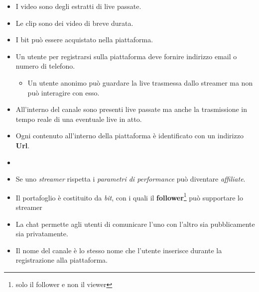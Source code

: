\begin{itemize}
    \item I video sono degli estratti di live passate.
    \item Le clip sono dei video di breve durata.
    \item I bit può essere acquistato nella piattaforma.
    \item Un utente per registrarsi sulla piattaforma deve fornire indirizzo email o numero di telefono.
    \begin{itemize}
        \item Un utente anonimo può guardare la live trasmessa dallo streamer ma non può interagire con esso. 
    \end{itemize}
    \item All'interno del canale sono presenti live passate ma anche la trasmissione in tempo reale di una eventuale live in atto.
    \item Ogni contenuto all'interno della piattaforma è identificato con un indirizzo \textbf{Url}.
    \item 
        \item Se uno \textit{streamer} rispetta i \textit{parametri di performance} può diventare \textit{affiliate}.
        \item Il portafoglio è costituito da \textit{bit}, con i quali il \textbf{follower}\footnote{solo il follower e non il viewer} può supportare lo streamer
        \item La chat permette agli utenti di comunicare l'uno con l'altro sia pubblicamente sia privatamente.
        \item Il nome del canale è lo stesso nome che l'utente inserisce durante la registrazione alla piattaforma.
\end{itemize}